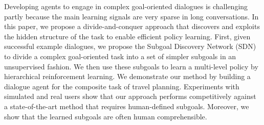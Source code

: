 Developing agents to engage in complex goal-oriented dialogues is challenging partly because the main learning signals are very sparse in long conversations. In this paper, we propose a divide-and-conquer approach that discovers and exploits the hidden structure of the task to enable efficient policy learning. First, given successful example dialogues, we propose the Subgoal Discovery Network (SDN) to divide a complex goal-oriented task into a set of simpler subgoals in an unsupervised fashion. We then use these subgoals to learn a multi-level policy by hierarchical reinforcement learning. We demonstrate our method by building a dialogue agent for the composite task of travel planning. Experiments with simulated and real users show that our approach performs competitively against a state-of-the-art method that requires human-defined subgoals. Moreover, we show that the learned subgoals are often human comprehensible.
